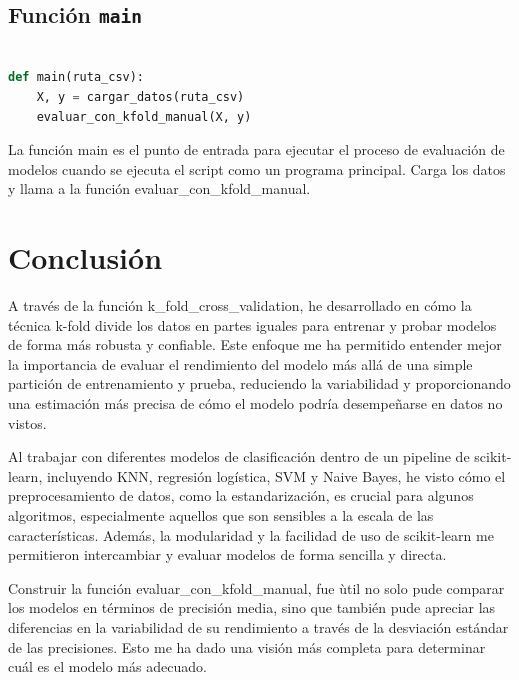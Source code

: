 \documentclass[12pt]{article}
\begin{document}
\vspace{1cm}

\subsection*{Función \texttt{main}}
\vspace{1cm}

\begin{lstlisting}[language=Python]

def main(ruta_csv):
	X, y = cargar_datos(ruta_csv)
	evaluar_con_kfold_manual(X, y)

\end{lstlisting}
\vspace{1cm}

La función main es el punto de entrada para ejecutar el proceso de evaluación de modelos cuando se ejecuta el script como un programa principal. Carga los datos y llama a la función evaluar\_con\_kfold\_manual.

\vspace{1cm}



\clearpage
\section*{Conclusión}

A través de la función k\_fold\_cross\_validation, he desarrollado en cómo la técnica k-fold divide los datos en partes iguales para entrenar y probar modelos de forma más robusta y confiable. Este enfoque me ha permitido entender mejor la importancia de evaluar el rendimiento del modelo más allá de una simple partición de entrenamiento y prueba, reduciendo la variabilidad y proporcionando una estimación más precisa de cómo el modelo podría desempeñarse en datos no vistos.

Al trabajar con diferentes modelos de clasificación dentro de un pipeline de scikit-learn, incluyendo KNN, regresión logística, SVM y Naive Bayes, he visto cómo el preprocesamiento de datos, como la estandarización, es crucial para algunos algoritmos, especialmente aquellos que son sensibles a la escala de las características. Además, la modularidad y la facilidad de uso de scikit-learn me permitieron intercambiar y evaluar modelos de forma sencilla y directa.

Construir la función evaluar\_con\_kfold\_manual, fue ùtil no solo pude comparar los modelos en términos de precisión media, sino que también pude apreciar las diferencias en la variabilidad de su rendimiento a través de la desviación estándar de las precisiones. Esto me ha dado una visión más completa para determinar cuál es el modelo más adecuado.
\end{document}

